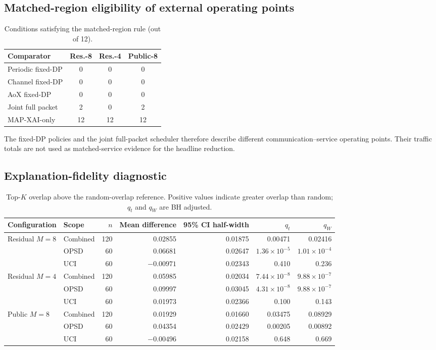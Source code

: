 \documentclass[10pt,conference]{IEEEtran}
\begin{document}
\subsection{Matched-region eligibility of external operating points}

\begin{table}[htbp]
\caption{Conditions satisfying the matched-region rule (out of 12).}
\label{tab:eligibility}
\centering\small
\begin{tabular}{lccc}
\toprule
Comparator & Res.-8 & Res.-4 & Public-8\\ \midrule
Periodic fixed-DP & 0 & 0 & 0\\
Channel fixed-DP & 0 & 0 & 0\\
AoX fixed-DP & 0 & 0 & 0\\
Joint full packet & 2 & 0 & 2\\
MAP-XAI-only & 12 & 12 & 12\\
\bottomrule
\end{tabular}
\end{table}

The fixed-DP policies and the joint full-packet scheduler therefore describe
different communication--service operating points. Their traffic totals are
not used as matched-service evidence for the headline reduction.

\subsection{Explanation-fidelity diagnostic}

\begin{table}[htbp]
\caption{Top-$K$ overlap above the random-overlap reference. Positive values
indicate greater overlap than random; $q_t$ and $q_W$ are BH adjusted.}
\label{tab:topk}
\centering\small
\begin{tabular}{llrrrrr}
\toprule
Configuration & Scope & $n$ & Mean difference & 95\% CI half-width & $q_t$ & $q_W$\\ \midrule
Residual $M=8$ & Combined & 120 & 0.02855 & 0.01875 & 0.00471 & 0.02416\\
 & OPSD & 60 & 0.06681 & 0.02647 & $1.36\times10^{-5}$ & $1.01\times10^{-4}$\\
 & UCI & 60 & $-0.00971$ & 0.02343 & 0.410 & 0.236\\ \midrule
Residual $M=4$ & Combined & 120 & 0.05985 & 0.02034 & $7.44\times10^{-8}$ & $9.88\times10^{-7}$\\
 & OPSD & 60 & 0.09997 & 0.03045 & $4.31\times10^{-8}$ & $9.88\times10^{-7}$\\
 & UCI & 60 & 0.01973 & 0.02366 & 0.100 & 0.143\\ \midrule
Public $M=8$ & Combined & 120 & 0.01929 & 0.01660 & 0.03475 & 0.08929\\
 & OPSD & 60 & 0.04354 & 0.02429 & 0.00205 & 0.00892\\
 & UCI & 60 & $-0.00496$ & 0.02158 & 0.648 & 0.669\\
\bottomrule
\end{tabular}
\end{table}
\end{document}
